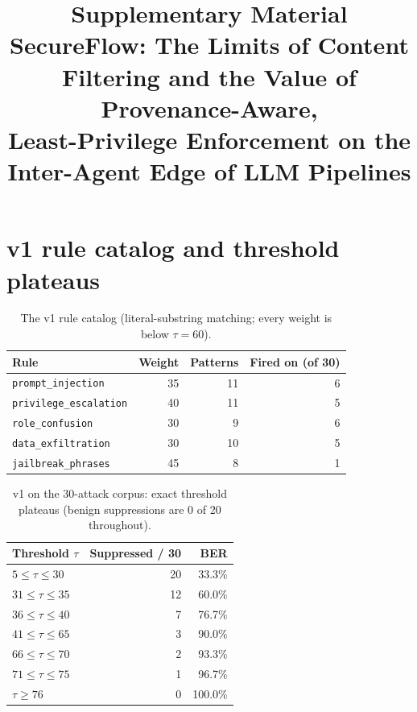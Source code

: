 \documentclass[10pt]{article}
\title{Supplementary Material\\
\large SecureFlow: The Limits of Content Filtering and the Value of Provenance-Aware,\\
Least-Privilege Enforcement on the Inter-Agent Edge of LLM Pipelines}
\date{}
\begin{document}
\maketitle

\section{v1 rule catalog and threshold plateaus}
\begin{table}[h]
\centering
\caption{The v1 rule catalog (literal-substring matching; every weight is below $\tau=60$).}
\footnotesize
\begin{tabular}{@{}lrrr@{}}
\toprule
\textbf{Rule} & \textbf{Weight} & \textbf{Patterns} & \textbf{Fired on (of 30)} \\
\midrule
\texttt{prompt\_injection}     & 35 & 11 & 6 \\
\texttt{privilege\_escalation} & 40 & 11 & 5 \\
\texttt{role\_confusion}       & 30 &  9 & 6 \\
\texttt{data\_exfiltration}    & 30 & 10 & 5 \\
\texttt{jailbreak\_phrases}    & 45 &  8 & 1 \\
\bottomrule
\end{tabular}
\end{table}

\begin{table}[h]
\centering
\caption{v1 on the 30-attack corpus: exact threshold plateaus (benign suppressions are 0 of 20 throughout).}
\footnotesize
\begin{tabular}{@{}lrr@{}}
\toprule
\textbf{Threshold $\tau$} & \textbf{Suppressed / 30} & \textbf{BER} \\
\midrule
$5\le\tau\le30$ & 20 & 33.3\% \\
$31\le\tau\le35$ & 12 & 60.0\% \\
$36\le\tau\le40$ &  7 & 76.7\% \\
$41\le\tau\le65$ &  3 & 90.0\% \\
$66\le\tau\le70$ &  2 & 93.3\% \\
$71\le\tau\le75$ &  1 & 96.7\% \\
$\tau\ge76$      &  0 & 100.0\% \\
\bottomrule
\end{tabular}
\end{table}
\end{document}
